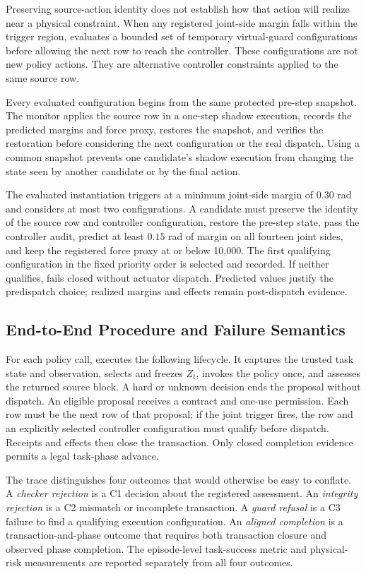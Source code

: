 Preserving source-action identity does not establish how that action will
realize near a physical constraint.  When any registered joint-side margin
falls within the trigger region, \guardscreening evaluates a bounded set of
temporary virtual-guard configurations before allowing the next row to reach
the controller.  These configurations are not new policy actions.  They are
alternative controller constraints applied to the same source row.

Every evaluated configuration begins from the same protected pre-step snapshot.
The monitor applies the source row in a one-step shadow execution, records the
predicted margins and force proxy, restores the snapshot, and verifies the
restoration before considering the next configuration or the real dispatch.
Using a common snapshot prevents one candidate's shadow execution from changing
the state seen by another candidate or by the final action.

The evaluated instantiation triggers at a minimum joint-side margin of
$0.30$ rad and considers at most two configurations.  A candidate must preserve
the identity of the source row and controller configuration, restore the
pre-step state, pass the controller audit, predict at least $0.15$ rad of margin
on all fourteen joint sides, and keep the registered force proxy at or below
10,000.  The first qualifying configuration in the fixed priority order is
selected and recorded.  If neither qualifies, \system fails closed without
actuator dispatch.  Predicted values justify the predispatch choice; realized
margins and effects remain post-dispatch evidence.

\subsection{End-to-End Procedure and Failure Semantics}

For each policy call, \system executes the following lifecycle.  It captures the
trusted task state and observation, selects and freezes $Z_t$, invokes the
policy once, and assesses the returned source block.  A hard or unknown decision
ends the proposal without dispatch.  An eligible proposal receives a contract
and one-use permission.  Each row must be the next row of that proposal; if the
joint trigger fires, the row and an explicitly selected controller configuration
must qualify before dispatch.  Receipts and effects then close the transaction.
Only closed completion evidence permits a legal task-phase advance.

The trace distinguishes four outcomes that would otherwise be easy to conflate.
A \emph{checker rejection} is a C1 decision about the registered assessment.  An
\emph{integrity rejection} is a C2 mismatch or incomplete transaction.  A
\emph{guard refusal} is a C3 failure to find a qualifying execution
configuration.  An \emph{aligned completion} is a transaction-and-phase outcome
that requires both transaction closure and observed phase completion.  The
episode-level task-success metric and physical-risk measurements are reported
separately from all four outcomes.
